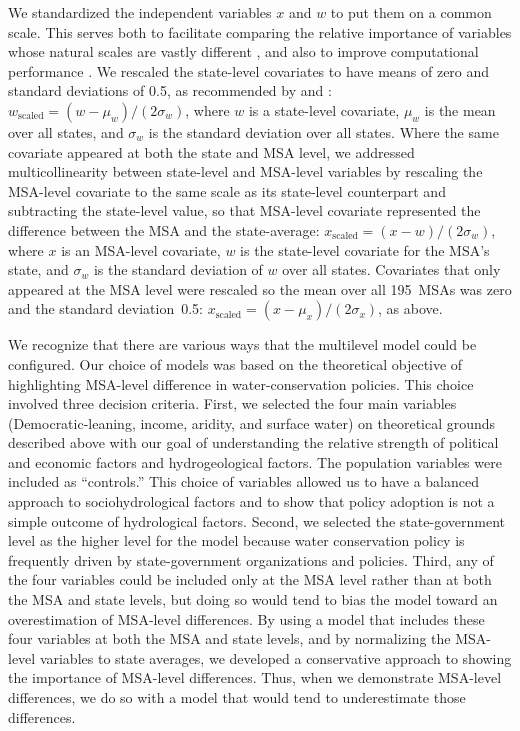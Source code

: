 \documentclass[draft,linenumbers]{agujournal}\usepackage{knitr}
\begin{document}
We standardized the independent variables $x$ and $w$ to put them on a common
scale. This serves both
to facilitate comparing the relative importance of variables whose natural scales are
vastly different
\citep[pp.~55--57]{gelman:prior:2008,gelman:arm:2007},
and also to improve computational performance \citep{stan:manual:2015}.
We rescaled the state-level covariates to have means of zero and
standard deviations of 0.5, as recommended by \citet{gelman:prior:2008}
and \citet[pp.~55--57]{gelman:arm:2007}:
$w_{\text{scaled}} = (w - \mu_w) / (2 \sigma_w)$,
where $w$ is a state-level covariate,
$\mu_w$ is the mean over all states,
and $\sigma_w$ is the standard deviation over all states.
Where the same covariate appeared at both the state and
MSA level,
we addressed multicollinearity between state-level and MSA-level
variables by rescaling the MSA-level covariate
to the same scale as its state-level counterpart and
subtracting the state-level value,
so that MSA-level covariate represented the difference between the MSA and
the state-average:
$x_{\text{scaled}} = (x - w) / (2 \sigma_w)$, where $x$ is an MSA-level
covariate, $w$ is the state-level covariate for the MSA's state, and $\sigma_w$
is the standard deviation of $w$ over all states.
Covariates that only appeared at the MSA level were rescaled so
the mean over all 195~MSAs was zero and the standard deviation~0.5:
$x_{\text{scaled}} = (x - \mu_x) / (2 \sigma_x)$, as above.

We recognize that there are various ways that the multilevel model could be
configured.
Our choice of models was based on the theoretical objective of highlighting MSA-level
difference in water-conservation policies. This choice involved three decision criteria.
First, we selected the four main variables (Democratic-leaning, income, aridity, and
surface water) on theoretical grounds described above with our goal of understanding the
relative strength of political and economic factors and hydrogeological factors. The
population variables were included as “controls.” This choice of variables allowed us to
have a balanced approach to sociohydrological factors and to show that policy adoption is
not a simple outcome of hydrological factors. Second, we selected the state-government
level as the higher level for the model because water conservation policy is frequently
driven by state-government organizations and policies. Third, any of the four variables
could be included only at the MSA level rather than at both the MSA and state levels, but
doing so would tend to bias the model toward an overestimation of MSA-level differences.
By using a model that includes these four variables at both the MSA and state levels, and
by normalizing the MSA-level variables to state averages, we developed a conservative
approach to showing the importance of MSA-level differences.
Thus, when we demonstrate MSA-level differences, we do so with a model that would tend
to underestimate those differences.
\end{document}
